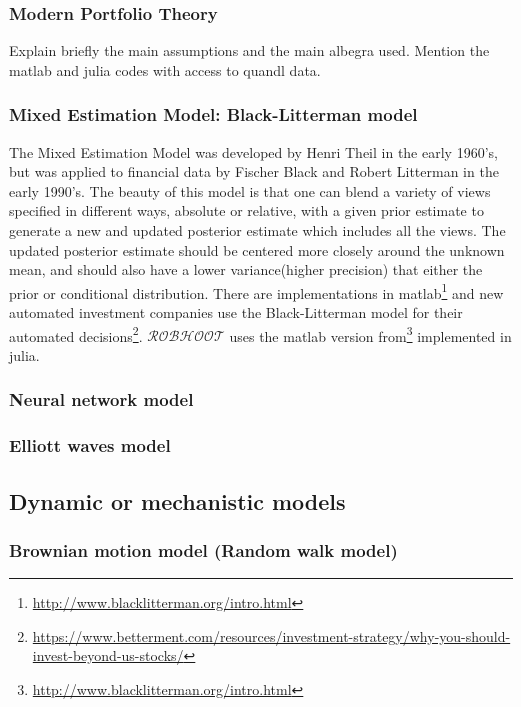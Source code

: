 \documentclass[english,12pt]{article}
\begin{document}
\subsubsection{Modern Portfolio Theory}

Explain briefly the main assumptions and the main albegra used. 
Mention the matlab and julia codes with access to quandl data.

\subsubsection{Mixed Estimation Model: Black-Litterman model}

The Mixed Estimation Model was developed by Henri Theil in the early 1960's, but was applied to financial data by Fischer Black and Robert Litterman in the early 1990's. The beauty of this model is that one can blend a variety of views specified in different ways, absolute or relative, with a given prior estimate to generate a new and updated posterior estimate which includes all the views. The updated posterior estimate should be centered more closely around the unknown mean, and should also have a lower variance(higher precision) that either the prior or conditional distribution. There are implementations in matlab\footnote{\url{http://www.blacklitterman.org/intro.html}} and new automated investment companies use the Black-Litterman model for their automated decisions\footnote{\url{https://www.betterment.com/resources/investment-strategy/why-you-should-invest-beyond-us-stocks/}}. $\mathcal{ROBHOOT}$ uses the matlab version from\footnote{\url{http://www.blacklitterman.org/intro.html}} implemented in julia. 


\subsubsection{Neural network model}

\subsubsection{Elliott waves model}


\subsection{Dynamic or mechanistic models}

\subsubsection{Brownian motion model (Random walk model)}
\end{document}

